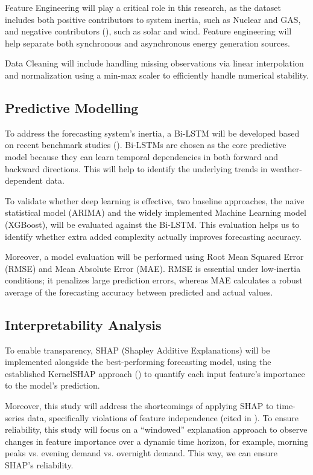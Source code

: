 \documentclass[12pt,a4paper,onecolumn]{article}
\begin{document}
Feature Engineering will play a critical role in this research, as the dataset includes both positive contributors to system inertia, such as Nuclear and GAS, and negative contributors (\cite{he2024analysis}), such as solar and wind. Feature engineering will help separate both synchronous and asynchronous energy generation sources.

Data Cleaning will include handling missing observations via linear interpolation and normalization using a min-max scaler to efficiently handle numerical stability.

\subsection{Predictive Modelling}
To address the forecasting system's inertia, a Bi-LSTM will be developed based on recent benchmark studies (\cite{santosh2024inertia}). Bi-LSTMs are chosen as the core predictive model because they can learn temporal dependencies in both forward and backward directions. This will help to identify the underlying trends in weather-dependent data.

To validate whether deep learning is effective, two baseline approaches, the naive statistical model (ARIMA) and the widely implemented Machine Learning model (XGBoost), will be evaluated against the Bi-LSTM. This evaluation helps us to identify whether extra added complexity actually improves forecasting accuracy.

Moreover, a model evaluation will be performed using Root Mean Squared Error (RMSE) and Mean Absolute Error (MAE). RMSE is essential under low-inertia conditions; it penalizes large prediction errors, whereas MAE calculates a robust average of the forecasting accuracy between predicted and actual values.
\subsection{Interpretability Analysis}
To enable transparency, SHAP (Shapley Additive Explanations) will be implemented alongside the best-performing forecasting model, using the established KernelSHAP approach (\cite{kruse2021revealing}) to quantify each input feature's importance to the model's prediction.

Moreover, this study will address the shortcomings of applying SHAP to time-series data, specifically violations of feature independence (cited in \cite{calero2025chronoshap}). To ensure reliability, this study will focus on a “windowed” explanation approach to observe changes in feature importance over a dynamic time horizon, for example, morning peaks vs. evening demand vs. overnight demand. This way, we can ensure SHAP's reliability.
\end{document}
